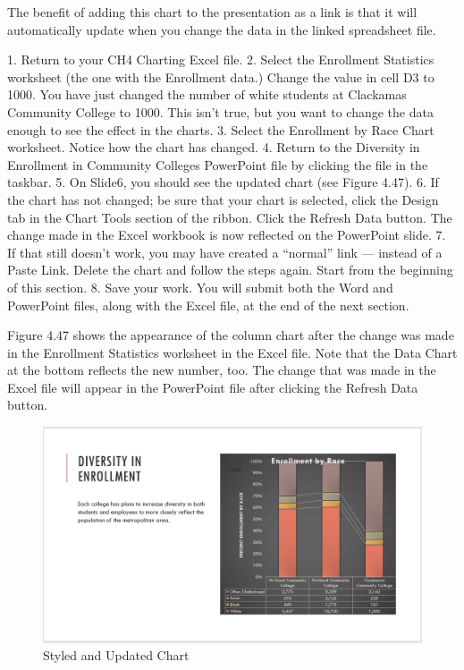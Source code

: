 The benefit of adding this chart to the presentation as a link is that it will automatically update when
you change the data in the linked spreadsheet file.

1. Return to your CH4 Charting Excel file.
2. Select the Enrollment Statistics worksheet (the one with the Enrollment data.) Change the
value in cell D3 to 1000. You have just changed the number of white students at Clackamas
Community College to 1000. This isn’t true, but you want to change the data enough to see the
effect in the charts.
3. Select the Enrollment by Race Chart worksheet. Notice how the chart has changed.
4. Return to the Diversity in Enrollment in Community Colleges PowerPoint file by clicking the
file in the taskbar.
5. On Slide6, you should see the updated chart (see Figure 4.47).
6. If the chart has not changed; be sure that your chart is selected, click the Design tab in the Chart
Tools section of the ribbon. Click the Refresh Data button. The change made in the Excel
workbook is now reflected on the PowerPoint slide.
7. If that still doesn’t work, you may have created a “normal” link — instead of a Paste Link.
Delete the chart and follow the steps again. Start from the beginning of this section.
8. Save your work. You will submit both the Word and PowerPoint files, along with the Excel file,
at the end of the next section.

Figure 4.47 shows the appearance of the column chart after the change was made in the Enrollment
Statistics worksheet in the Excel file. Note that the Data Chart at the bottom reflects the new number,
too. The change that was made in the Excel file will appear in the PowerPoint file after clicking the
Refresh Data button.



\begin{figure}[H]
	\centering
	\includegraphics[width=\maxwidth{.95\linewidth}]{gfx/ch04_fig50}
	\caption{Styled and Updated Chart}
	\label{04:fig50}
\end{figure}


